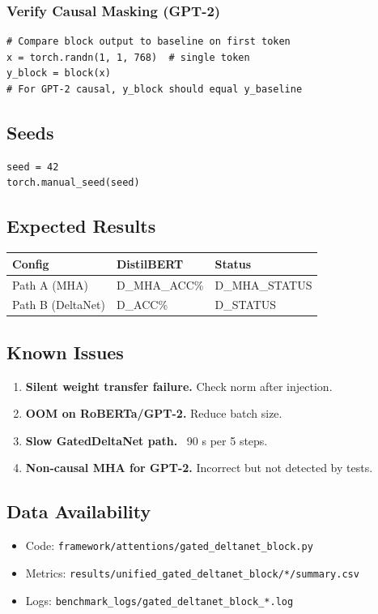 \subsubsection{Verify Causal Masking (GPT-2)}

\begin{lstlisting}
# Compare block output to baseline on first token
x = torch.randn(1, 1, 768)  # single token
y_block = block(x)
# For GPT-2 causal, y_block should equal y_baseline
\end{lstlisting}

\subsection{Seeds}

\begin{lstlisting}
seed = 42
torch.manual_seed(seed)
\end{lstlisting}

\subsection{Expected Results}

\begin{table}[H]
\centering
\small
\begin{tabular}{lll}
\toprule
\textbf{Config} & \textbf{DistilBERT} & \textbf{Status} \\
\midrule
Path A (MHA) & {{D\_MHA\_ACC}}\% & {{D\_MHA\_STATUS}} \\
Path B (DeltaNet) & {{D\_ACC}}\% & {{D\_STATUS}} \\
\bottomrule
\end{tabular}
\end{table}

\subsection{Known Issues}

\begin{enumerate}
\item \textbf{Silent weight transfer failure.} Check norm after injection.
\item \textbf{OOM on RoBERTa/GPT-2.} Reduce batch size.
\item \textbf{Slow GatedDeltaNet path.} ~90 s per 5 steps.
\item \textbf{Non-causal MHA for GPT-2.} Incorrect but not detected by tests.

\end{enumerate}
\subsection{Data Availability}

\begin{itemize}
\item Code: \texttt{framework/attentions/gated\_deltanet\_block.py}
\item Metrics: \texttt{results/unified\_gated\_deltanet\_block/*/summary.csv}
\item Logs: \texttt{benchmark\_logs/gated\_deltanet\_block\_*.log}

\end{itemize}
